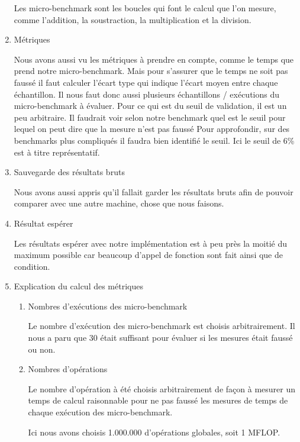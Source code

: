 \documentclass[11pt, letterpaper]{article}
\begin{document}
\begin{enumerate}
Les micro-benchmark sont les boucles qui font le calcul que l'on mesure,
comme l'addition, la soustraction, la multiplication et la division.

\item Métriques
\label{sec:org15a7d17}

Nous avons aussi vu les métriques à prendre en compte, comme le temps que
prend notre micro-benchmark. Mais pour s'assurer que le temps ne soit pas
faussé il faut calculer l'écart type qui indique l'écart moyen
entre chaque échantillon. Il nous faut donc aussi plusieurs échantillons
/ exécutions du micro-benchmark à évaluer. Pour ce qui est du seuil de
validation, il est un peu arbitraire. Il faudrait voir selon notre benchmark
quel est le seuil pour lequel on peut dire que la mesure n'est pas faussé
Pour approfondir, sur des benchmarks plus compliqués il faudra bien
identifié le seuil. Ici le seuil de 6\% est à titre représentatif.

\item Sauvegarde des résultats bruts
\label{sec:orgf5ca3cd}

Nous avons aussi appris qu'il fallait garder les résultats bruts afin de
pouvoir comparer avec une autre machine, chose que nous faisons.

\item Résultat espérer
\label{sec:org0a8c5dc}

Les résultats espérer avec notre implémentation est à peu près la moitié
du maximum possible car beaucoup d'appel de fonction sont fait ainsi que de
condition.

\item Explication du calcul des métriques
\label{sec:org8616773}
\begin{enumerate}
\item Nombres d'exécutions des micro-benchmark
\label{sec:orge256b5e}

Le nombre d'exécution des micro-benchmark est choisis arbitrairement. Il
nous a paru que 30 était suffisant pour évaluer si les mesures était
faussé ou non.

\item Nombres d'opérations
\label{sec:org5decd47}

Le nombre d'opération à été choisis arbitrairement de façon à mesurer un
temps de calcul raisonnable pour ne pas faussé les mesures de temps de
chaque exécution des micro-benchmark.

Ici nous avons choisis 1.000.000 d'opérations globales, soit 1 MFLOP.


\end{enumerate}
\end{enumerate}
\end{document}
